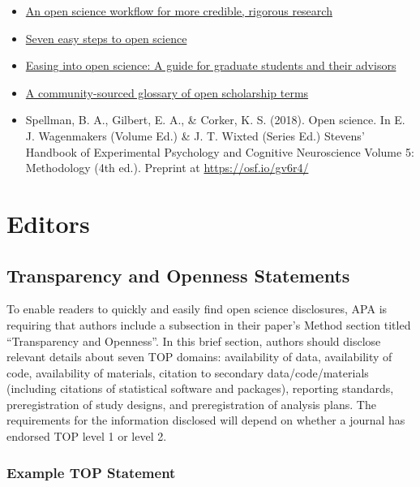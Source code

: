 \documentclass[
  oneside]{book}
\begin{document}
\begin{itemize}
\item
  \href{https://psyarxiv.com/wu6sn}{An open science workflow for more credible, rigorous research} \citep{corker2021open}
\item
  \href{https://doi.org/10.1027/2151-2604/a000387}{Seven easy steps to open science} \citep{cruwell2019seven}
\item
  \href{https://doi.org/10.1525/collabra.18684}{Easing into open science: A guide for graduate students and their advisors} \citep{kathawalla2021easing}
\item
  \href{https://doi.org/10.1038/s41562-021-01269-4}{A community-sourced glossary of open scholarship terms} \citep{parsons2022community}
\item
  Spellman, B. A., Gilbert, E. A., \& Corker, K. S. (2018). Open science. In E. J. Wagenmakers (Volume Ed.) \& J. T. Wixted (Series Ed.) Stevens' Handbook of Experimental Psychology and Cognitive Neuroscience Volume 5: Methodology (4th ed.). Preprint at \url{https://osf.io/gv6r4/}
\end{itemize}

\hypertarget{part-editors}{%
\part{Editors}\label{part-editors}}

\hypertarget{transparency-and-openness-statements}{%
\chapter{Transparency and Openness Statements}\label{transparency-and-openness-statements}}

To enable readers to quickly and easily find open science disclosures, APA is requiring that authors include a subsection in their paper's Method section titled ``Transparency and Openness''. In this brief section, authors should disclose relevant details about seven TOP domains: availability of data, availability of code, availability of materials, citation to secondary data/code/materials (including citations of statistical software and packages), reporting standards, preregistration of study designs, and preregistration of analysis plans. The requirements for the information disclosed will depend on whether a journal has endorsed TOP level 1 or level 2.

\hypertarget{example-top-statement}{%
\section{Example TOP Statement}\label{example-top-statement}}
\end{document}

